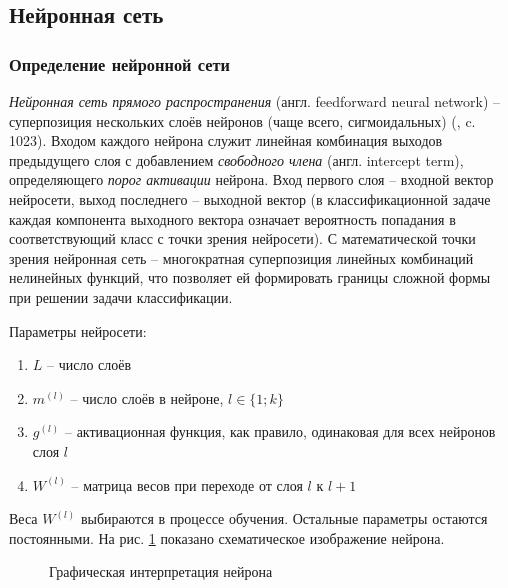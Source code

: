 \documentclass[../body.tex]{subfiles}
\begin{document}
\subsection{Нейронная сеть}
\subsubsection{Определение нейронной сети}
\textit{Нейронная сеть прямого распространения} (англ. feedforward neural network) – суперпозиция нескольких слоёв нейронов (чаще всего, сигмоидальных) (\cite{gonsales}, c. 1023). Входом каждого нейрона служит линейная комбинация выходов предыдущего слоя с добавлением \textit{свободного члена} (англ. intercept term), определяющего \textit{порог активации} нейрона. Вход первого слоя – входной вектор нейросети, выход последнего – выходной вектор (в классификационной задаче каждая компонента выходного вектора означает вероятность попадания в соответствующий класс с точки зрения нейросети). С математической точки зрения нейронная сеть – многократная суперпозиция линейных комбинаций нелинейных функций, что позволяет ей формировать границы сложной формы при решении задачи классификации.

Параметры нейросети:
\begin{enumerate}
	\item $L$ -- число слоёв
	\item $m^{(l)}$ -- число слоёв в нейроне, $l \in \{1;k\}$
	\item $g^{(l)}$ -- активационная функция, как правило, одинаковая для всех нейронов слоя $l$
	\item $W^{(l)}$ -- матрица весов при переходе от слоя $l$ к $l+1$
\end{enumerate}

Веса $W^{(l)}$ выбираются в процессе обучения. Остальные параметры остаются постоянными. На рис. \ref{nnetNeuron} показано схематическое изображение нейрона. 

\begin{figure}[H]
	\caption{Графическая интерпретация нейрона}
	\label{nnetNeuron}
\end{figure}
\end{document}
